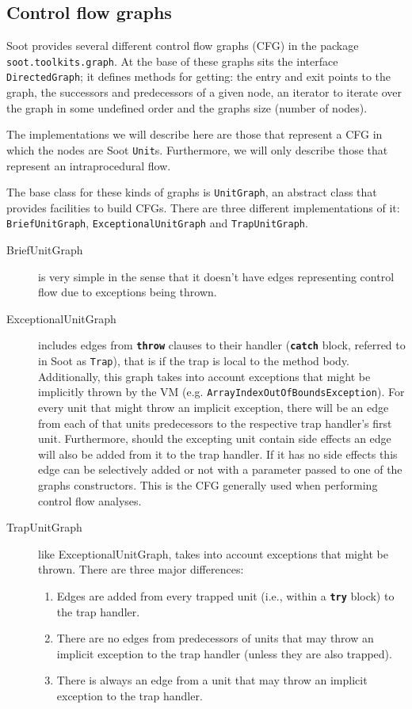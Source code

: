 \documentclass{article}
\newcommand{\keyw}[1]{\texttt{\textbf{#1}}}
\newcommand{\code}[1]{\texttt{\small #1}}
\begin{document}
\subsection{Control flow graphs}
\label{section:cfg}

Soot provides several different control flow graphs (CFG) in the
package \linebreak \code{soot.toolkits.graph}. At the base of these
graphs sits the interface \code{DirectedGraph}; it defines methods for
getting: the entry and exit points to the graph, the successors and
predecessors of a given node, an iterator to iterate over the graph in
some undefined order and the graphs size (number of nodes).

The implementations we will describe here are those that represent a
CFG in which the nodes are Soot \code{Unit}s. Furthermore, we will
only describe those that represent an intraprocedural flow.

The base class for these kinds of graphs is \code{UnitGraph}, an
abstract class that provides facilities to build CFGs. There are three
different implementations of it: \code{BriefUnitGraph},
\code{ExceptionalUnitGraph} and \code{TrapUnitGraph}.
\begin{description}
\item[BriefUnitGraph] is very simple in the sense that it doesn't have
  edges representing control flow due to exceptions being thrown.
\item[ExceptionalUnitGraph] includes edges from \keyw{throw} clauses
  to their handler (\keyw{catch} block, referred to in Soot as
  \code{Trap}), that is if the trap is local to the method
  body. Additionally, this graph takes into account exceptions that
  might be implicitly thrown by the VM (e.g.
  \code{ArrayIndex\-OutOfBoundsException}). For every unit that might
  throw an implicit exception, there will be an edge from each of that
  units predecessors to the respective trap handler's first
  unit. Furthermore, should the excepting unit contain side effects
  an edge will also be added from it to the trap handler. If it has no
  side effects this edge can be selectively added or not with a
  parameter passed to one of the graphs constructors. This is the CFG
  generally used when performing control flow analyses.
\item[TrapUnitGraph] like ExceptionalUnitGraph, takes into account
  exceptions that might be thrown. There are three major differences:
  \begin{enumerate}
  \item Edges are added from every trapped unit (i.e., within a
    \keyw{try} block) to the trap handler.
  \item There are no edges from predecessors of units that may throw
    an implicit exception to the trap handler (unless they are also
    trapped).
  \item There is always an edge from a unit that may throw an implicit
    exception to the trap handler.
  \end{enumerate}
\end{description}
\end{document}
